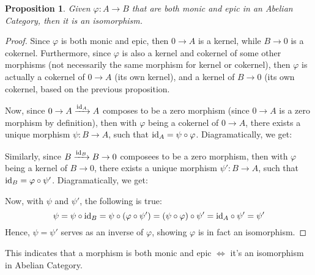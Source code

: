 \documentclass[x11names,reqno,12pt]{extarticle}
\newtheorem{prop}{Proposition}
\newcommand{\id}{\textmd{id}}
\begin{document}
\begin{prop}
    Given $\varphi:A\rightarrow B$ that are both monic and epic in an Abelian Category, then it is an isomorphism.
\end{prop}
\begin{proof}
    Since $\varphi$ is both monic and epic, then $0\rightarrow A$ is a kernel, while $B\rightarrow 0$ is a cokernel. Furthermore, since $\varphi$ is also a kernel and cokernel of some other morphisms (not necessarily the same morphism for kernel or cokernel), then $\varphi$ is actually a cokernel of $0\rightarrow A$ (its own kernel), and a kernel of $B\rightarrow 0$ (its own cokernel, based on the previous proposition.

    Now, since $0\rightarrow A\xrightarrow{\id_A}A$ composes to be a zero morphism (since $0\rightarrow A$ is a zero morphism by definition), then with $\varphi$ being a cokernel of $0\rightarrow A$, there exists a unique morphism $\psi:B\rightarrow A$, such that $\id_A = \psi\circ\varphi$. Diagramatically, we get:
    \begin{center}
    \end{center}
    
    Similarly, since $B\xrightarrow{\id_B} B\rightarrow 0$ composees to be a zero morphism, then with $\varphi$ being a kernel of $B\rightarrow 0$, there exists a unique morphism $\psi':B\rightarrow A$, such that $\id_B = \varphi\circ\psi'$. Diagramatically, we get:
    \begin{center}
    \end{center}
    Now, with $\psi$ and $\psi'$, the following is true:
    $$\psi = \psi\circ \id_B = \psi\circ (\varphi\circ \psi') = (\psi\circ\varphi)\circ \psi' = \id_A \circ \psi' = \psi'$$
    Hence, $\psi=\psi'$ serves as an inverse of $\varphi$, showing $\varphi$ is in fact an isomorphism.
\end{proof}
This indicates that a morphism is both monic and epic $\iff$ it's an isomorphism in Abelian Category.
\end{document}

